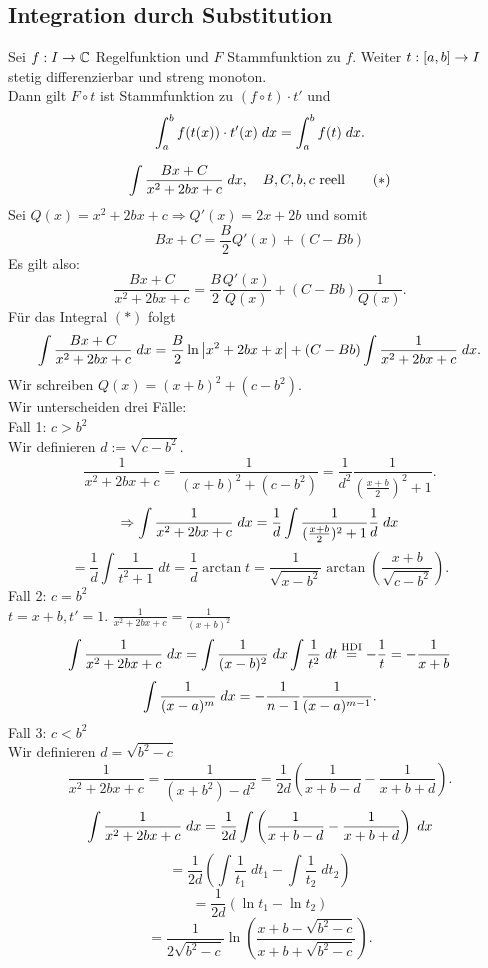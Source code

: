 \documentclass[../ana2u.tex]{subfiles}
\begin{document}
\subsection*{Integration durch Substitution}
Sei \( \abb{f}{I}{\C} \) Regelfunktion und \(F\) Stammfunktion zu \(f\).
Weiter \( \abb{t}{[a,b]}{I} \) stetig differenzierbar und streng monoton. \\
Dann gilt \( F \circ t \) ist Stammfunktion zu \( (f\circ t) \cdot t' \)
und \[ \integral{f(t(x)) \cdot t'(x)}{a}{b} 
= \integral{f(t)}{a}{b}. \]
\begin{bsp}
    \[ \int \frac{Bx + C}{x^2 + 2bx + c} \dx, 
    \quad B, C, b, c \text{ reell} \tag{\(*\)} \]
    Sei \( Q(x) = x^2 +2bx + c \Rightarrow Q'(x) = 2x+2b \) und somit
    \[ Bx + C = \frac{B}{2} Q'(x) + (C-Bb) \]
    Es gilt also:
    \[ \frac{ Bx + C }{x^2 + 2bx + c} 
    = \frac{B}{2} \frac{Q'(x)}{Q(x)} 
    + (C-Bb) \frac{1}{Q(x)}. \]
    Für das Integral \((*)\) folgt
    \[ \int \frac{Bx + C}{x^2 + 2bx + c} \dx 
    = \frac{B}{2} \ln \abs{x^2 + 2bx + x} 
    + (C-Bb) \int \frac{1}{x^2 + 2bx + c} \dx. \]
    Wir schreiben \( Q(x) = (x+b)^2 + (c-b^2) \).\\
    Wir unterscheiden drei Fälle: \\
    Fall 1: \( c > b^2 \) \\
    Wir definieren \( d := \sqrt{c - b^2} \).
    \[ \frac{1}{x^2 + 2bx + c} 
    = \frac{1}{ (x+b)^2 + (c - b^2) }
    = \frac{1}{d^2} \frac{1}{(\frac{x+b}{2})^2 + 1}. \]
    \[ \Rightarrow \int \frac{1}{x^2 + 2bx + c} \dx 
    = \frac{1}{d} \int \frac{1}{(\frac{x+b}{2})^2 + 1} 
    \frac{1}{d} \dx \]
    \[ = \frac{1}{d} \int \frac{1}{t^2 + 1} \; dt 
    = \frac{1}{d} \arctan t
    = \frac{1}{\sqrt{x - b^2}} 
    \arctan\left(\frac{x+b}{\sqrt{c-b^2}}\right). \]
    Fall 2: \( c = b^2 \) \\
    \( t = x + b, t' = 1 \).
    \( \frac{1}{x^2+2bx + c} = \frac{1}{(x+b)^2} \)
    \[ \int \frac{1}{x^2+2bx + c} \dx = \int \frac{1}{(x-b)^2} \dx
    \int \frac{1}{t^2} \; dt \oversett{HDI}{=} 
    -\frac{1}{t} = -\frac{1}{x+b} \]
    \[ \int \frac{1}{(x-a)^m} \dx 
    = - \frac{1}{n-1} \frac{1}{(x-a)^{m-1}}. \]
    Fall 3: \( c < b^2 \) \\
    Wir definieren \( d = \sqrt{b^2 -c} \)
    \[ \frac{1}{x^2+2bx + c} = \frac{1}{(x+b^2) - d^2}
    = \frac{1}{2d}\left( \frac{1}{x+b-d} - \frac{1}{x+b+d} \right). \]
    \[ \int \frac{1}{x^2 + 2bx + c} \dx 
    = \frac{1}{2d} 
    \int \left( \frac{1}{x+b-d} 
    - \frac{1}{x+b+d} \right) \dx \]
    \[ = \frac{1}{2d} \left( \int \frac{1}{t_1} \;dt_1
    - \int \frac{1}{t_2} \; dt_2 \right) \]
    \[ = \frac{1}{2d} (\ln t_1 - \ln t_2) \]
    \[ = \frac{1}{2\sqrt{b^2-c}} \ln 
    \left( \frac{x+b-\sqrt{b^2-c}}{x+b+\sqrt{b^2-c}} \right). \]
\end{bsp}
\end{document}
